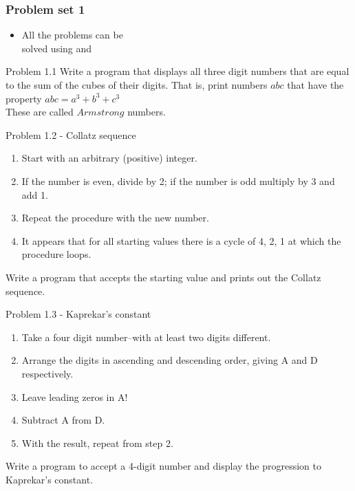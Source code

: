 \documentclass[14pt,compress]{beamer}
\newcommand{\kwrd}[1]{ \texttt{\textbf{\color{blue}{#1}}}  }
\begin{document}

\begin{frame}
  \frametitle{Problem set 1}
  \begin{itemize}
    \item All the problems can be\\
      solved using \kwrd{if} and \kwrd{while} 
  \end{itemize}
\end{frame}

\begin{frame}{Problem 1.1}
  Write a program that displays all three digit numbers that are equal to the sum of the cubes of their digits. That is, print numbers $abc$ that have the property $abc = a^3 + b^3 + c^3$\\
These are called $Armstrong$ numbers.
\end{frame}
  
\begin{frame}{Problem 1.2 - Collatz sequence}
\begin{enumerate}
  \item Start with an arbitrary (positive) integer. 
  \item If the number is even, divide by 2; if the number is odd multiply by 3 and add 1.
  \item Repeat the procedure with the new number.
  \item It appears that for all starting values there is a cycle of 4, 2, 1 at which the procedure loops.
\end{enumerate}
    Write a program that accepts the starting value and prints out the Collatz sequence.

\end{frame}

\begin{frame}{Problem 1.3 - Kaprekar's constant}
  \begin{enumerate}
    \item Take a four digit number--with at least two digits different.
    \item Arrange the digits in ascending and descending order, giving A and D respectively.
    \item Leave leading zeros in A!
    \item Subtract A from D.
    \item With the result, repeat from step 2.
  \end{enumerate}
  Write a program to accept a 4-digit number and display the progression to Kaprekar's constant.
\end{frame}
\end{document}
